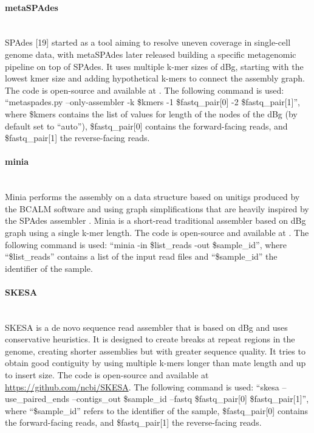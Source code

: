 \paragraph{metaSPAdes} \mbox{}\\

SPAdes [19] started as a tool aiming to resolve uneven coverage in single-cell genome data, with metaSPAdes \cite{nurk_metaspades_2017} later released building a specific metagenomic pipeline on top of SPAdes. It uses multiple k-mer sizes of dBg, starting with the lowest kmer size and adding hypothetical k-mers to connect the assembly graph. The code is open-source and available at \cite{noauthor_spades_nodate}. The following command is used: “metaspades.py --only-assembler -k \$kmers -1 \$fastq\_pair[0] -2 \$fastq\_pair[1]”, where \$kmers contains the list of values for length of the nodes of the dBg (by default set to “auto”), \$fastq\_pair[0] contains the forward-facing reads, and \$fastq\_pair[1] the reverse-facing reads.

\paragraph{minia} \mbox{}\\

Minia \cite{chikhi_space-efficient_2013} performs the assembly on a data structure based on unitigs produced by the BCALM \cite{chikhi_compacting_2016} software and using graph simplifications that are heavily inspired by the SPAdes assembler \cite{bankevich_spades_2012}. Minia is a short-read traditional assembler based on dBg graph using a single k-mer length. The code is open-source and available at  \cite{noauthor_minia_2022}. The following command is used: “minia -in \$list\_reads -out \$sample\_id”,  where “\$list\_reads” contains a list of the input read files and “\$sample\_id” the identifier of the sample.

\paragraph{SKESA} \mbox{}\\

SKESA \cite{souvorov_skesa_2018} is a de novo sequence read assembler that is based on dBg and uses conservative heuristics. It is designed to create breaks at repeat regions in the genome, creating shorter assemblies but with greater sequence quality. It tries to obtain good contiguity by using multiple k-mers longer than mate length and up to insert size. The code is open-source and available at \url{https://github.com/ncbi/SKESA}. The following command is used: “skesa --use\_paired\_ends --contigs\_out \$sample\_id --fastq \$fastq\_pair[0] \$fastq\_pair[1]”, where “\$sample\_id” refers to the identifier of the sample, \$fastq\_pair[0] contains the forward-facing reads, and \$fastq\_pair[1] the reverse-facing reads.

